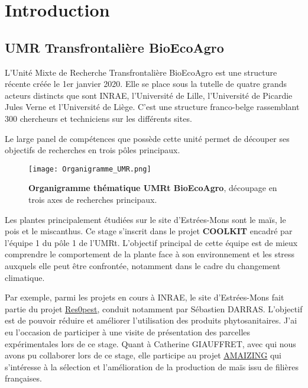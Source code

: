 \documentclass[twoside]{article}
\begin{document}
\section{\textbf{Introduction}}
    \subsection{UMR Transfrontalière BioEcoAgro}
    
        L'Unité Mixte de Recherche Transfrontalière BioEcoAgro est une structure récente créée le 1er janvier 2020. Elle se place sous la tutelle de quatre grands acteurs distincts que sont INRAE, l'Université de Lille, l'Université de Picardie Jules Verne et l'Université de Liège. C'est une structure franco-belge rassemblant 300 chercheurs et techniciens sur les différents sites.
        
        Le large panel de compétences que possède cette unité permet de découper ses objectifs de recherches en trois pôles principaux.

        \begin{figure}[h]
            \centering
            \texttt{[image: Organigramme\_UMR.png]}
            \caption[Organigramme thématique UMRt BioEcoAgro]{\textbf{Organigramme thématique UMRt BioEcoAgro}, découpage en trois axes de recherches principaux.}
        \end{figure}
        
        \vspace{0.5cm}Les plantes principalement étudiées sur le site d'Estrées-Mons sont le maïs, le pois et le miscanthus. Ce stage s'inscrit dans le projet \textbf{COOLKIT} encadré par l'équipe 1 du pôle 1 de l'UMRt. L'objectif principal de cette équipe est de mieux comprendre le comportement de la plante face à son environnement et les stress auxquels elle peut être confrontée, notamment dans le cadre du changement climatique. 
        
        \vspace{0.5cm}Par exemple, parmi les projets en cours à INRAE, le site d'Estrées-Mons fait partie du projet \href{https://www6.inrae.fr/reseau-pic/Projets/Res0Pest}{\underline{Res0pest}}, conduit notamment par Sébastien DARRAS. L'objectif est de pouvoir réduire et améliorer l'utilisation des produits phytosanitaires. J'ai eu l'occasion de participer à une visite de présentation des parcelles expérimentales lors de ce stage. 
        Quant à Catherine GIAUFFRET, avec qui nous avons pu collaborer lors de ce stage, elle participe au projet  \href{https://amaizing.fr/en/}{\underline{AMAIZING}} qui s'intéresse à la sélection et l'amélioration de la production de maïs issu de filières françaises.
        
\end{document}
